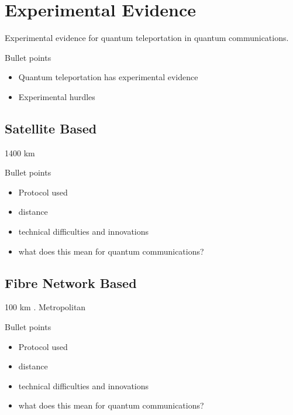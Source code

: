 \section{Experimental Evidence}
Experimental evidence for quantum teleportation in quantum communications.
\begin{mybox}{Bullet points}
    \begin{itemize}
        \item Quantum teleportation has experimental evidence
        \item Experimental hurdles
    \end{itemize}
\end{mybox}
\subsection{Satellite Based}
1400 km \cite{Ren:2017}
\begin{mybox}{Bullet points}
    \begin{itemize}
        \item Protocol used
        \item distance
        \item technical difficulties and innovations
        \item what does this mean for quantum communications?
    \end{itemize}
\end{mybox}


\subsection{Fibre Network Based}
100 km \cite{Takesue:2015}. Metropolitan \cite{Valivarthi:2016}
\begin{mybox}{Bullet points}
    \begin{itemize}
        \item Protocol used
        \item distance
        \item technical difficulties and innovations
        \item what does this mean for quantum communications?
    \end{itemize}
\end{mybox} 
